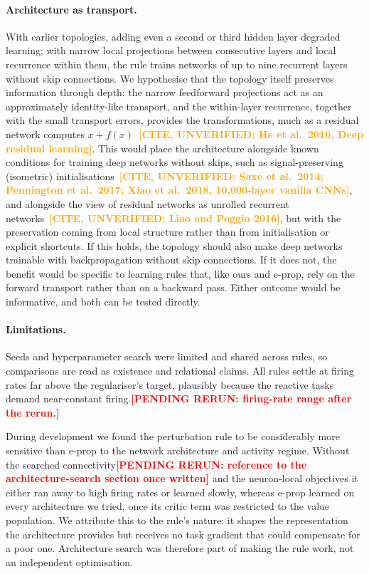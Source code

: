 \documentclass[10pt,twocolumn]{article}
\newcommand{\pending}[1]{\textcolor{red}{\bfseries[PENDING RERUN#1]}}
\newcommand{\unverified}[1]{\textcolor{orange}{\bfseries[CITE, UNVERIFIED: #1]}}
\begin{document}
\paragraph{Architecture as transport.}
With earlier topologies, adding even a second or third hidden layer degraded learning;
with narrow local projections between consecutive layers and local recurrence within
them, the rule trains networks of up to nine recurrent layers without skip connections.
We hypothesise that the topology itself preserves information through depth: the narrow
feedforward projections act as an approximately identity-like transport, and the
within-layer recurrence, together with the small transport errors, provides the
transformations, much as a residual network computes $x+f(x)$~\unverified{He et al.\
2016, Deep residual learning}. This would place the architecture alongside known
conditions for training deep networks without skips, such as signal-preserving
(isometric) initialisations~\unverified{Saxe et al.\ 2014; Pennington et al.\ 2017;
Xiao et al.\ 2018, 10,000-layer vanilla CNNs}, and alongside the view of residual
networks as unrolled recurrent networks~\unverified{Liao and Poggio 2016}, but with the
preservation coming from local structure rather than from initialisation or explicit
shortcuts. If this holds, the topology should also make deep networks trainable with
backpropagation without skip connections. If it does not, the benefit would be specific
to learning rules that, like ours and e-prop, rely on the forward transport rather than
on a backward pass. Either outcome would be informative, and both can be tested
directly.

\paragraph{Limitations.}
Seeds and hyperparameter search were limited and shared across rules, so comparisons are
read as existence and relational claims. All rules settle at firing rates far above the
regulariser's target, plausibly because the reactive tasks demand near-constant
firing.\pending{: firing-rate range after the rerun.}

During development we found the perturbation rule to be considerably more sensitive than
e-prop to the network architecture and activity regime. Without the searched
connectivity\pending{: reference to the architecture-search section once written} and the
neuron-local objectives it either ran away to high firing rates or learned slowly, whereas
e-prop learned on every architecture we tried, once its critic term was restricted to the
value population. We attribute this to the rule's nature: it shapes the representation the
architecture provides but receives no task gradient that could compensate for a poor one.
Architecture search was therefore part of making the rule work, not an independent
optimisation.
\end{document}
